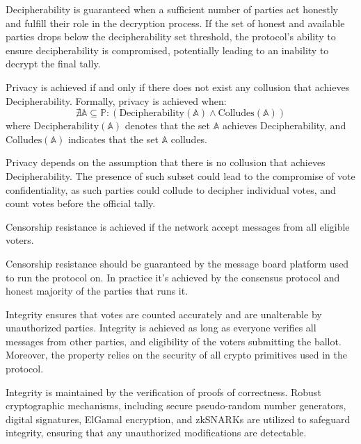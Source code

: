 \documentclass[runningheads]{llncs}
\begin{document}
Decipherability is guaranteed when a sufficient number of parties act honestly and fulfill their role in the decryption process. If the set of honest and available parties drops below the decipherability set threshold, the protocol's ability to ensure decipherability is compromised, potentially leading to an inability to decrypt the final tally.

\begin{definition}[Privacy] \label{def:privacy}
    Privacy is achieved if and only if there does not exist any collusion that achieves Decipherability. Formally, privacy is achieved when:
    \[
    \nexists \mathbb{A} \subseteq \mathbb{P} : (\text{Decipherability}(\mathbb{A}) \land \text{Colludes}(\mathbb{A}))
    \]
    where \( \text{Decipherability}(\mathbb{A}) \) denotes that the set \( \mathbb{A} \) achieves Decipherability, and \( \text{Colludes}(\mathbb{A}) \) indicates that the set \( \mathbb{A} \) colludes.
\end{definition}

Privacy depends on the assumption that there is no collusion that achieves Decipherability. The presence of such subset could lead to the compromise of vote confidentiality, as such parties could collude to decipher individual votes, and count votes before the official tally.


\begin{definition}
    Censorship resistance is achieved if the network accept messages from all eligible voters.
\end{definition}

Censorship resistance should be guaranteed by the message board platform used to run the protocol on. In practice it's achieved by the consensus protocol and honest majority of the parties that runs it. 

\begin{definition}[Integrity]
    Integrity ensures that votes are counted accurately and are unalterable by unauthorized parties. Integrity is achieved as long as everyone verifies all messages from other parties, and eligibility of the voters submitting the ballot. Moreover, the property relies on the security of all crypto primitives used in the protocol.
\end{definition}

Integrity is maintained by the verification of proofs of correctness. Robust cryptographic mechanisms, including secure pseudo-random number generators, digital signatures, ElGamal encryption,  and zkSNARKs are utilized to safeguard integrity, ensuring that any unauthorized modifications are detectable.
\end{document}
